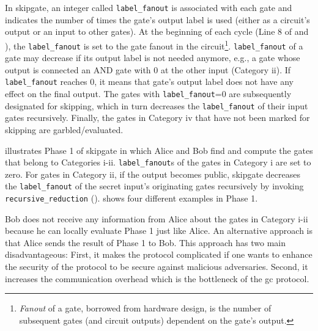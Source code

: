 In \gls{skipgate}, an integer called \texttt{label\_fanout} is associated with each gate and indicates the number of times the gate's output label is used (either as a circuit's output or an input to other gates).
At the beginning of each cycle (Line 8 of  and ), the \texttt{label\_fanout} is set to the gate fanout in the circuit\footnote{\textit{Fanout} of a gate, borrowed from hardware design, is the number of subsequent gates (and circuit outputs) dependent on the gate’s output.}.
\texttt{label\_fanout} of a gate may decrease if its output label is not needed anymore, e.g., a gate whose output is connected an AND gate with 0 at the other input (Category ii).
If \texttt{label\_fanout} reaches 0, it means that gate's output label does not have any effect on the final output.
The gates with \texttt{label\_fanout}=0 are subsequently designated for skipping, which in turn decreases the \texttt{label\_fanout} of their input gates recursively.
Finally, the gates in Category iv that have not been marked for skipping are garbled/evaluated.

\begin{algorithm}[]
\caption{Phase 1 in \gls{skipgate} for both Alice and Bob sides.}\label{alg:phase1}
\begin{algorithmic}[1]
		\ENDIF
	\ENDIF
\ENDFOR
\end{algorithmic}
\end{algorithm}

 illustrates Phase 1 of \gls{skipgate} in which Alice and Bob find and compute the gates that belong to Categories i-ii.
\texttt{label\_fanout}s of the gates in Category i are set to zero.
For gates in Category ii, if the output becomes public, \gls{skipgate} decreases the \texttt{label\_fanout} of the secret input's originating gates recursively by invoking \texttt{recursive\_reduction} ().
 shows four different examples in Phase 1.

Bob does not receive any information from Alice about the gates in Category i-ii because he can locally evaluate Phase 1 just like Alice.
An alternative approach is that Alice sends the result of Phase 1 to Bob.
This approach has two main disadvantageous:
First, it makes the protocol complicated if one wants to enhance the security of the protocol to be secure against malicious adversaries.
Second, it increases the communication overhead which is the bottleneck of the \acrshort{gc} protocol.

